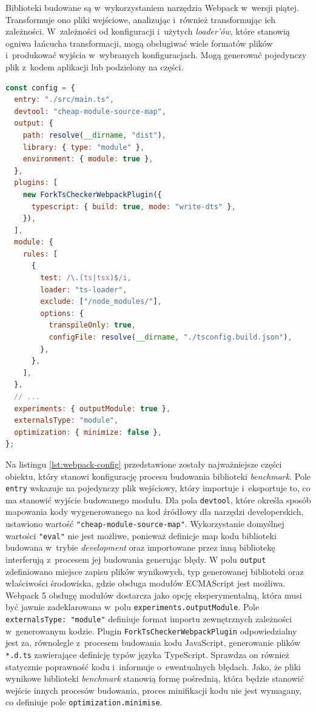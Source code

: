 Biblioteki budowane są w~wykorzystaniem narzędzia Webpack w~wersji piątej. Transformuje ono pliki wejściowe, analizując i~również transformując ich zależności. W~zależności od konfiguracji i~użytych \textit{loader'ów}, które stanowią ogniwa łańcucha transformacji, mogą obsługiwać wiele formatów plików i~produkować wyjścia w~wybranych konfiguracjach. Mogą generować pojedynczy plik z~kodem aplikacji lub podzielony na części.

\begin{lstlisting}[language=JavaScript, caption=Konfiguracja narzędzia Webpack służąca do budowania biblioteki \textit{benchmark},label=lst:webpack-config]
const config = {
  entry: "./src/main.ts",
  devtool: "cheap-module-source-map",
  output: {
    path: resolve(__dirname, "dist"),
    library: { type: "module" },
    environment: { module: true },
  },
  plugins: [
    new ForkTsCheckerWebpackPlugin({
      typescript: { build: true, mode: "write-dts" },
    }),
  ],
  module: {
    rules: [
      {
        test: /\.(ts|tsx)$/i,
        loader: "ts-loader",
        exclude: ["/node_modules/"],
        options: {
          transpileOnly: true,
          configFile: resolve(__dirname, "./tsconfig.build.json"),
        },
      },
    ],
  },
  // ...
  experiments: { outputModule: true },
  externalsType: "module",
  optimization: { minimize: false },
};
\end{lstlisting}

Na listingu \ref{lst:webpack-config} przedstawione zostały najważniejsze części obiektu, który stanowi konfigurację procesu budowania biblioteki \textit{benchmark}. Pole \lstinline{entry} wskazuje na pojedynczy plik wejściowy, który importuje i~eksportuje to, co ma stanowić wyjście budowanego modułu. Dla pola \lstinline{devtool}, które określa sposób mapowania kody wygenerowanego na kod źródłowy dla narzędzi developerskich, ustawiono wartość \lstinline{"cheap-module-source-map"}. Wykorzystanie domyślnej wartości \lstinline{"eval"} nie jest możliwe, ponieważ definicje map kodu biblioteki budowana w~trybie \textit{development} oraz importowane przez inną bibliotekę interferują z~procesem jej budowania generując błędy.
W polu \lstinline{output} zdefiniowano miejsce zapisu plików wynikowych, typ generowanej biblioteki oraz właściwości środowiska, gdzie obsługa modułów ECMAScript jest możliwa. Webpack 5 obsługę modułów dostarcza jako opcję eksperymentalną, która musi być jawnie zadeklarowana w~polu \lstinline{experiments.outputModule}. Pole \lstinline{externalsType: "module"} definiuje format importu zewnętrznych zależności w~generowanym kodzie. Plugin \lstinline{ForkTsCheckerWebpackPlugin} odpowiedzialny jest za, równolegle z~procesem budowania kodu JavaScript, generowanie plików \lstinline{*.d.ts} zawierające definicję typów języka TypeScript. Sprawdza on również statycznie poprawność kodu i~informuje o~ewentualnych błędach. Jako, że pliki wynikowe biblioteki \textit{benchmark} stanowią formę pośrednią, która będzie stanowić wejście innych procesów budowania, proces minifikacji kodu nie jest wymagany, co definiuje pole \lstinline{optimization.minimise}.

